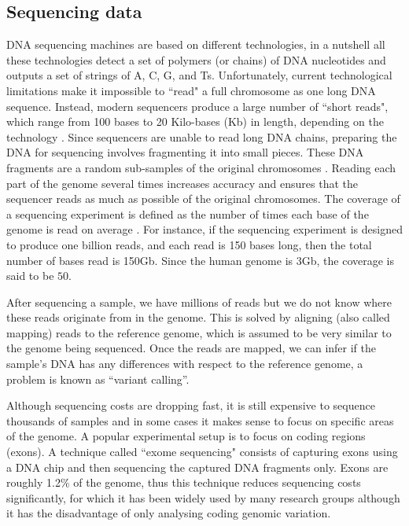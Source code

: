 \subsection{Sequencing data}

DNA sequencing machines are based on different technologies, in a nutshell all these technologies detect a set of polymers (or chains) of DNA nucleotides and outputs a set of strings of A, C, G, and Ts. 
Unfortunately, current technological limitations make it impossible to ``read" a full chromosome as one long DNA sequence. 
Instead, modern sequencers produce a large number of ``short reads", which range from 100 bases to 20 Kilo-bases (Kb) in length, depending on the technology \cite{quail2012tale}. 
Since sequencers are unable to read long DNA chains, preparing the DNA for sequencing involves fragmenting it into small pieces. 
These DNA fragments are a random sub-samples of the original chromosomes \cite{shendure2008next}. 
Reading each part of the genome several times increases accuracy and ensures that the sequencer reads as much as possible of the original chromosomes. 
The coverage of a sequencing experiment is defined as the number of times each base of the genome is read on average \cite{shendure2008next,quail2012tale}. 
For instance, if the sequencing experiment is designed to produce one billion reads, and each read is 150 bases long, then the total number of bases read is 150Gb. Since the human genome is 3Gb, the coverage is said to be $50$.

After sequencing a sample, we have millions of reads but we do not know where these reads originate from in the genome. 
This is solved by aligning (also called mapping) reads to the reference genome, which is assumed to be very similar to the genome being sequenced. Once the reads are mapped, we can infer if the sample's DNA has any differences with respect to the reference genome, a problem is known as ``variant calling''. 

Although sequencing costs are dropping fast, it is still expensive to sequence thousands of samples and in some cases it makes sense to focus on specific areas of the genome. 
A popular experimental setup is to focus on coding regions (exons). 
A technique called ``exome sequencing" \cite{clark2011performance} consists of capturing exons using a DNA chip and then sequencing the captured DNA fragments only. 
Exons are roughly 1.2\% of the genome, thus this technique reduces sequencing costs significantly, for which it has been widely used by many research groups although it has the disadvantage of only analysing coding genomic variation.

